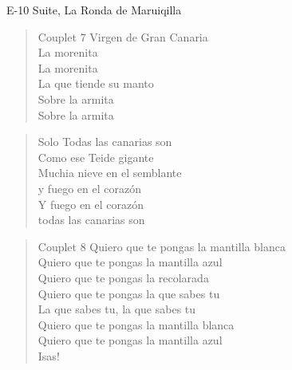 \begin{song}[vals]{E-10 Suite, La Ronda de Maruiqilla}
\begin{verse}{Couplet 7}
Virgen de Gran Cana\chord{}ria\\
\chord{}La morenita\\
La morenita\\
La que tiende su man\chord{}to\\
\chord{}Sobre la armita\\
Sobre la armita\\
\end{verse}

\begin{verse}{Solo}
Todas las canarias son\\
Como ese Teide gigante\\
Muchia nieve en el semblante\\
y fuego en el corazón\\
Y fuego en el corazón\\
todas las canarias son\\
\end{verse}

\begin{verse}{Couplet 8}
\chord{}Quiero que te pongas la mantilla blanca\\
Quiero que te pongas la mantilla azul\\
\chord{}Quiero que te pongas la recolarada\\
Quiero que te pongas la que sabes tu\\
La que sabes tu, la que sabes tu\\
\chord{}Quiero que te pongas la mantilla blanca\\
Quiero que te pongas la mantilla azul\\
\chord{}Isas!\hspace{1em}\hspace{1em}
\end{verse}
\end{song}
